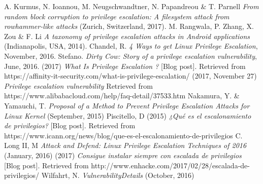 \documentclass[10pt,journal,compsoc]{IEEEtran}
\begin{document}
\begin{thebibliography}{1}
 A. Kurmus, N. Ioannou, M. Neugschwandtner, N. Papandreou \& T. Parnell \emph{From random block corruption to privilege escalation: A filesystem attack from rowhammer-like attacks} (Zurich, Switzerland, 2017).
 M. Rangwala, P. Zhang, X. Zou \& F. Li \emph{A taxonomy of privilege escalation attacks in Android applications} (Indianapolis, USA, 2014).
 Chandel, R. \emph{4 Ways to get Linux Privilege Escalation}, November, 2016.
 Stefano. \emph{Dirty Cow: Story of a privilege escalation vulnerability}, June, 2016.
 (2017) \emph{What Is Privilege Escalation ?} [Blog post]. Retrieved from https://affinity-it-security.com/what-is-privilege-escalation/
 (2017, November 27) \emph{Privilege escalation vulnerability} Retrieved from https://www.alibabacloud.com/help/faq-detail/37533.htm
 Nakamura, Y. \& Yamauchi, T. \emph{Proposal of a Method to Prevent Privilege Escalation Attacks for Linux Kernel} (September, 2015)
 Piscitello, D (2015) \emph{¿Qué es el escalonamiento de privilegios?} [Blog post]. Retrieved from https://www.icann.org/news/blog/que-es-el-escalonamiento-de-privilegios
 C. Long II, M \emph{Attack and Defend: Linux Privilege Escalation Techniques of 2016} (January, 2016)
 (2017) \emph{Consigue instalar siempre con escalada de privilegios} [Blog post]. Retrieved from http://www.enhacke.com/2017/02/28/escalada-de-privilegios/
 Wilfahrt, N. \emph{VulnerabilityDetails} (October, 2016)



\end{thebibliography}
\end{document}
